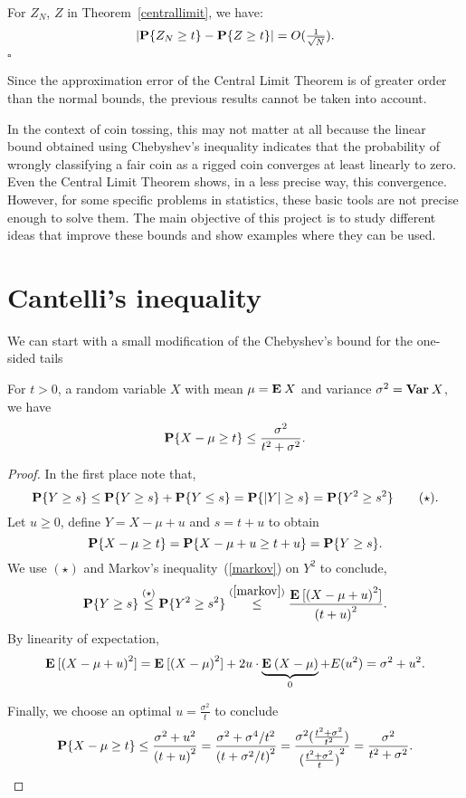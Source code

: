 \begin{theorem}\label{berryessen}
  For $Z_N$, $Z$ in Theorem~\ref{centrallimit}, we have:
  \[ \left|\P\{Z_N \geq t\} - \P\{Z \geq t\}\right| = O(\tfrac{1}{\sqrt{N}}). \]
  \hfill $\square$
\end{theorem}

Since the approximation error of the Central Limit Theorem is of greater order than the normal bounds, the previous results cannot be taken into account.

\vspace*{1em}

In the context of coin tossing, this may not matter at all because the linear bound obtained using Chebyshev's inequality indicates that the probability of wrongly classifying a fair coin as a rigged coin converges at least linearly to zero. Even the Central Limit Theorem shows, in a less precise way, this convergence. However, for some specific problems in statistics, these basic tools are not precise enough to solve them. The main objective of this project is to study different ideas that improve these bounds and show examples where they can be used.

\section{Cantelli's inequality}
We can start with a small modification of the Chebyshev's bound for the one-sided tails

\begin{theorem}\label{cantelli}
  For $t > 0$, a random variable $X$ with mean $\mu = \E X$ and variance $\sigma^2 = \Var X$, we have
  \[ \P\{X-\mu \geq t\} \leq \frac{\sigma^2}{t^2 + \sigma^2}. \] 
\end{theorem}

\begin{proof}
  In the first place note that,
  \[ \P\{ Y \geq s\} \leq \P\{ Y \geq s\} + \P\{ Y \leq s\} = \P\{|Y| \geq s\} = \P\{ Y^2 \geq s^2\} \tag*{($\star$)}. \] 
  Let $u \geq 0$, define $Y = X-\mu + u$ and $s = t+u$ to obtain
  \[ \P\{X-\mu \geq t\} = \P\{X-\mu + u \geq t + u\} = \P\{Y \geq s\}. \]
  We use $(\star)$ and Markov's inequality~(\ref{markov}) on $Y^2$ to conclude,
  \[ \P\{Y \geq s\} \overset{(\star)}{\leq} \P\{ Y^2 \geq s^2\} \overset{(\ref{markov})}{\leq} \frac{\E[{(X-\mu+u)}^2]}{{(t+u)}^2}.\]
  By linearity of expectation,
  \[ \E[{(X-\mu+u)}^2] = \E[{(X-\mu)}^2] + 2u \cdot \underbrace{\E(X-\mu)}_{0} + E(u^2) = \sigma^2 + u^2. \]

  Finally, we choose an optimal $u = \frac{\sigma^2}{t}$ to conclude
  \[
    \P\{X-\mu \geq t\} \leq \frac{\sigma^2 + u^2}{{(t+u)}^2}
     = \frac{\sigma^2 + \sigma^4/t^2}{{{(t+\sigma^2/t)}^2}}
     = \frac{\sigma^2 (\tfrac{t^2+\sigma^2}{t^2})}{{(\tfrac{t^2+\sigma^2}{t})}^2}
     = \frac{\sigma^2}{t^2+\sigma^2}.\]
\end{proof}

